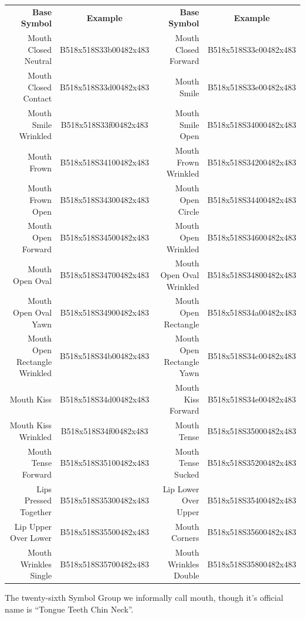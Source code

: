 \documentclass{article}
\begin{document}
\begin{center}
\begin{tabular}{rcrc}
\textbf{Base Symbol}&\textbf{Example}&\textbf{Base Symbol}&\textbf{Example}\\
Mouth Closed Neutral         &B518x518S33b00482x483&Mouth Closed Forward     &B518x518S33c00482x483\\
Mouth Closed Contact         &B518x518S33d00482x483&Mouth Smile              &B518x518S33e00482x483\\
Mouth Smile Wrinkled         &B518x518S33f00482x483&Mouth Smile Open         &B518x518S34000482x483\\
Mouth Frown                  &B518x518S34100482x483&Mouth Frown Wrinkled     &B518x518S34200482x483\\
Mouth Frown Open             &B518x518S34300482x483&Mouth Open Circle        &B518x518S34400482x483\\
Mouth Open Forward           &B518x518S34500482x483&Mouth Open Wrinkled      &B518x518S34600482x483\\
Mouth Open Oval              &B518x518S34700482x483&Mouth Open Oval Wrinkled &B518x518S34800482x483\\
Mouth Open Oval Yawn         &B518x518S34900482x483&Mouth Open Rectangle     &B518x518S34a00482x483\\
Mouth Open Rectangle Wrinkled&B518x518S34b00482x483&Mouth Open Rectangle Yawn&B518x518S34c00482x483\\
Mouth Kiss                   &B518x518S34d00482x483&Mouth Kiss Forward       &B518x518S34e00482x483\\
Mouth Kiss Wrinkled          &B518x518S34f00482x483&Mouth Tense              &B518x518S35000482x483\\
Mouth Tense Forward          &B518x518S35100482x483&Mouth Tense Sucked       &B518x518S35200482x483\\
Lips Pressed Together        &B518x518S35300482x483&Lip Lower Over Upper     &B518x518S35400482x483\\
Lip Upper Over Lower         &B518x518S35500482x483&Mouth Corners            &B518x518S35600482x483\\
Mouth Wrinkles Single        &B518x518S35700482x483&Mouth Wrinkles Double    &B518x518S35800482x483\\
\end{tabular}
\end{center}

The twenty-sixth Symbol Group we informally call mouth, though it's official name is ``Tongue Teeth Chin Neck''.
\end{document}
